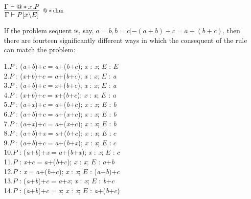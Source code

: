 $\infer[\reason{$@*\operatorname{elim}$}]
       {\Gamma  |- P[x\backslash E]}
       {\Gamma  |- @*x.P}$

If the problem sequent is, say, $a=b,b=c |- (a+b)+c=a+(b+c)$, then there are fourteen significantly different ways in which the consequent of the rule can match the problem:

1.\tab $P$ : (\textit{a}+\textit{b})+$c$\ensuremath{=}\textit{a}+(\textit{b}+$c$); \textit{x} : \textit{x}; $E$ : $E$\\
2.\tab $P$ : (\textit{x}+\textit{b})+$c$\ensuremath{=}\textit{a}+(\textit{b}+$c$); \textit{x} : \textit{x}; $E$ : \textit{a}\\
3.\tab $P$ : (\textit{a}+\textit{b})+$c$\ensuremath{=}\textit{x}+(\textit{b}+$c$); \textit{x} : \textit{x}; $E$ : \textit{a}\\
4.\tab $P$ : (\textit{x}+\textit{b})+$c$\ensuremath{=}\textit{x}+(\textit{b}+$c$); \textit{x} : \textit{x}; $E$ : \textit{a}\\
5.\tab $P$ : (\textit{a}+\textit{x})+$c$\ensuremath{=}\textit{a}+(\textit{b}+$c$); \textit{x} : \textit{x}; $E$ : \textit{b}\\
6.\tab $P$ : (\textit{a}+\textit{b})+$c$\ensuremath{=}\textit{a}+(\textit{x}+$c$); \textit{x} : \textit{x}; $E$ : \textit{b}\\
7.\tab $P$ : (\textit{a}+\textit{x})+$c$\ensuremath{=}\textit{a}+(\textit{x}+$c$); \textit{x} : \textit{x}; $E$ : \textit{b}\\
8.\tab $P$ : (\textit{a}+\textit{b})+\textit{x}\ensuremath{=}\textit{a}+(\textit{b}+$c$); \textit{x} : \textit{x}; $E$ : $c$\\
9.\tab $P$ : (\textit{a}+\textit{b})+$c$\ensuremath{=}\textit{a}+(\textit{b}+\textit{x}); \textit{x} : \textit{x}; $E$ : $c$\\
10.\tab $P$ : (\textit{a}+\textit{b})+\textit{x}\ensuremath{=}\textit{a}+(\textit{b}+\textit{x}); \textit{x} : \textit{x}; $E$ : $c$\\
11.\tab $P$ : \textit{x}+$c$\ensuremath{=}\textit{a}+(\textit{b}+$c$); \textit{x} : \textit{x}; $E$ : \textit{a}+\textit{b}\\
12.\tab $P$ : \textit{x}\ensuremath{=}\textit{a}+(\textit{b}+$c$); \textit{x} : \textit{x}; $E$ : (\textit{a}+\textit{b})+$c$\\
13.\tab $P$ : (\textit{a}+\textit{b})+$c$\ensuremath{=}\textit{a}+\textit{x}; \textit{x} : \textit{x}; $E$ : \textit{b}+$c$\\
14.\tab $P$ : (\textit{a}+\textit{b})+$c$\ensuremath{=}\textit{x}; \textit{x} : \textit{x}; $E$ : \textit{a}+(\textit{b}+$c$)


